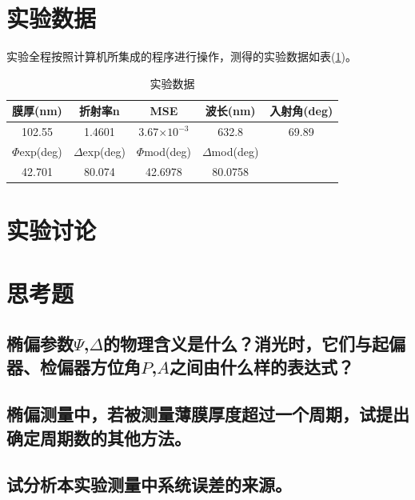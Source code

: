 \documentclass[a4paper]{article}
\begin{document}
\section{实验数据}
实验全程按照计算机所集成的程序进行操作，测得的实验数据如表(\ref{data})。
\begin{table}[!h]
\centering
\caption{实验数据}
\label{data}
\begin{tabular}{|c|c|c|c|c|}
\hline
膜厚(nm)         & 折射率n             & MSE            & 波长(nm)           & 入射角(deg) \\ \hline
102.55         & 1.4601           & 3.67$\times 10^{-3}$      & 632.8            & 69.89    \\ \hline
$\Phi$exp(deg) & $\Delta$exp(deg) & $\Phi$mod(deg) & $\Delta$mod(deg) &          \\ \hline
42.701         & 80.074           & 42.6978        & 80.0758          &          \\ \hline
\end{tabular}
\end{table}

\section{实验讨论}

\section{思考题}
\subsection{椭偏参数$\Psi$,$\Delta$的物理含义是什么？消光时，它们与起偏器、检偏器方位角$P$,$A$之间由什么样的表达式？}
\subsection{椭偏测量中，若被测量薄膜厚度超过一个周期，试提出确定周期数的其他方法。}
\subsection{试分析本实验测量中系统误差的来源。}

\nocite{jiaocai}

\end{document}
